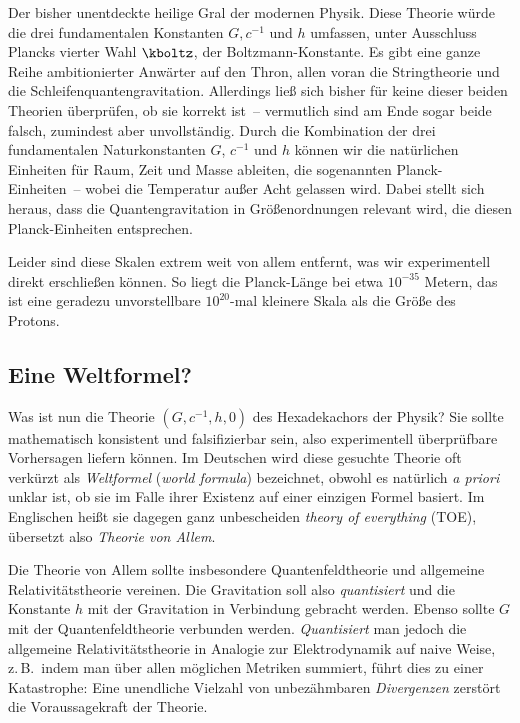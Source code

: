 
\newpage {}
\label{sec:1110}

Der bisher unentdeckte heilige Gral der modernen Physik. Diese Theorie würde die drei fundamentalen Konstanten $G,c^{−1}$ und $h$ umfassen, unter Ausschluss Plancks vierter Wahl $\kboltz$, der Boltzmann-Konstante. Es gibt eine ganze Reihe ambitionierter Anwärter auf den Thron, allen voran die Stringtheorie und die Schleifenquantengravitation. Allerdings ließ sich bisher für keine dieser beiden Theorien überprüfen, ob sie korrekt ist~-- vermutlich sind am Ende sogar beide falsch, zumindest aber unvollständig. Durch die Kombination der drei fundamentalen Naturkonstanten $G$, $c^{-1}$ und $h$ können wir die natürlichen Einheiten für Raum, Zeit und Masse ableiten, die sogenannten Planck-Einheiten~-- wobei die Temperatur außer Acht gelassen wird. Dabei stellt sich heraus, dass die Quantengravitation in Größenordnungen relevant wird, die diesen Planck-Einheiten entsprechen.

Leider sind diese Skalen extrem weit von allem entfernt, was wir experimentell direkt erschließen können. So liegt die Planck-Länge bei etwa $10^{−35}$ Metern, das ist eine geradezu unvorstellbare $10^{20}$-mal kleinere Skala als die Größe des Protons.


\subsection*{Eine Weltformel?}

Was ist nun die Theorie $(G,c^{-1},h,0)$ des Hexadekachors der Physik? Sie sollte mathematisch konsistent und falsifizierbar sein, also experimentell überprüfbare Vorhersagen liefern können. Im Deutschen wird diese gesuchte Theorie oft verkürzt als \emph{Weltformel} (\emph{world formula}) bezeichnet, obwohl es natürlich \textit{a priori} unklar ist, ob sie im Falle ihrer Existenz auf einer einzigen Formel basiert. Im Englischen heißt sie dagegen ganz unbescheiden \emph{theory of everything} (TOE), übersetzt also \emph{Theorie von Allem}.

Die Theorie von Allem sollte insbesondere Quantenfeldtheorie und allgemeine Relativitätstheorie vereinen. Die Gravitation soll also \emph{quantisiert} und die Konstante $h$ mit der Gravitation in Verbindung gebracht werden. Ebenso sollte $G$ mit der Quantenfeldtheorie verbunden werden. \emph{Quantisiert} man jedoch die allgemeine Relativitätstheorie in Analogie zur Elektrodynamik auf naive Weise, z.\,B.\ indem man über allen möglichen Metriken summiert, führt dies zu einer Katastrophe: Eine unendliche Vielzahl von unbezähmbaren \emph{Divergenzen} zerstört die Voraussagekraft der Theorie.

